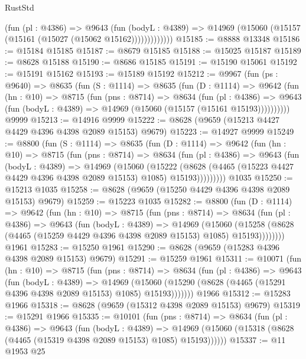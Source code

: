 \begin{lexlean}{RustStd}
\begin{coremodule}
                (fun (pl : @4386) =>
                @9643
                  (fun (bodyL : @4389) =>
                  @14969 (@15060 (@15157 (@15161 (@15027 (@15062 @15162)))))))))))))
@15185 := @8888 @13348
@15186 := @15184 @15185
@15187 := @8679 @15185
@15188 := @15025 @15187
@15189 := @8628 @15188
@15190 := @8686 @15185
@15191 := @15190 @15061
@15192 := @15191 @15162
@15193 := @15189 @15192
@15212 := @9967
    (fun (ps : @9640) =>
    @8635
      (fun (S : @1114) =>
      @8635
        (fun (D : @1114) =>
        @9642
          (fun (hn : @10) =>
          @8715
            (fun (pns : @8714) =>
            @8634
              (fun (pl : @4386) =>
              @9643 (fun (bodyL : @4389) => @14969 (@15060 (@15157 (@15161 @15193))))))))))
    @9999
@15213 := @14916 @9999
@15222 := @8628 (@9659 (@15213 @4427 @4429 @4396 @4398 @2089 @15153) @9679)
@15223 := @14927 @9999
@15249 := @8800
    (fun (S : @1114) =>
    @8635
      (fun (D : @1114) =>
      @9642
        (fun (hn : @10) =>
        @8715
          (fun (pns : @8714) =>
          @8634
            (fun (pl : @4386) =>
            @9643
              (fun (bodyL : @4389) =>
              @14969
                (@15060
                  (@15222
                    (@8628
                      (@4465 (@15223 @4427 @4429 @4396 @4398 @2089 @15153) @1085)
                      @15193)))))))))
    @1035
@15250 := @15213 @1035
@15258 := @8628 (@9659 (@15250 @4429 @4396 @4398 @2089 @15153) @9679)
@15259 := @15223 @1035
@15282 := @8800
    (fun (D : @1114) =>
    @9642
      (fun (hn : @10) =>
      @8715
        (fun (pns : @8714) =>
        @8634
          (fun (pl : @4386) =>
          @9643
            (fun (bodyL : @4389) =>
            @14969
              (@15060
                (@15258 (@8628 (@4465 (@15259 @4429 @4396 @4398 @2089 @15153) @1085) @15193))))))))
    @1961
@15283 := @15250 @1961
@15290 := @8628 (@9659 (@15283 @4396 @4398 @2089 @15153) @9679)
@15291 := @15259 @1961
@15311 := @10071
    (fun (hn : @10) =>
    @8715
      (fun (pns : @8714) =>
      @8634
        (fun (pl : @4386) =>
        @9643
          (fun (bodyL : @4389) =>
          @14969
            (@15060 (@15290 (@8628 (@4465 (@15291 @4396 @4398 @2089 @15153) @1085) @15193)))))))
    @1966
@15312 := @15283 @1966
@15318 := @8628 (@9659 (@15312 @4398 @2089 @15153) @9679)
@15319 := @15291 @1966
@15335 := @10101
    (fun (pns : @8714) =>
    @8634
      (fun (pl : @4386) =>
      @9643
        (fun (bodyL : @4389) =>
        @14969 (@15060 (@15318 (@8628 (@4465 (@15319 @4398 @2089 @15153) @1085) @15193))))))
@15337 := @11 @1953 @25

\end{coremodule}
\end{lexlean}
